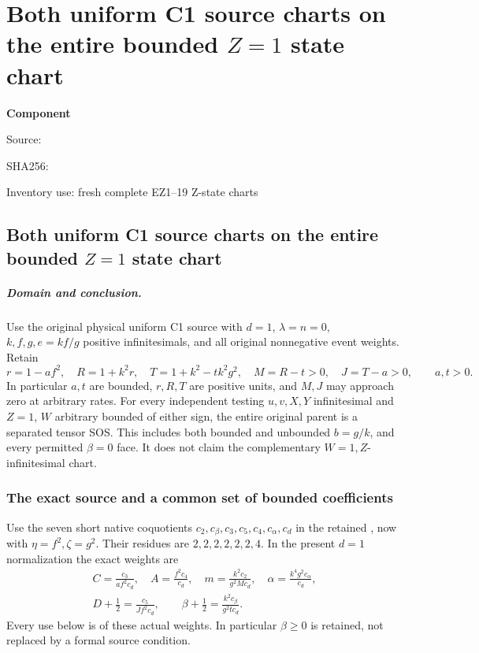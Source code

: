 \chapter{Both uniform C1 source charts on the entire bounded \(Z=1\) state chart}
\label{component:pa4f6d1e57f34}
\noindent\textbf{Component }\par
{\small\noindent Source: \par}
{\small\noindent SHA256: \par}
{\small\noindent Inventory use: fresh complete EZ1--19 Z-state charts\par}
\medskip
\section{Both uniform C1 source charts on the entire bounded \(Z=1\) state chart}
\label{pa4f6d1e57f34:sec:uniform-c1-z-new}

\paragraph{Domain and conclusion.}
Use the original physical uniform C1 source with $d=1$,
$\lambda=n=0$, $k,f,g,e=kf/g$ positive infinitesimals, and
all original nonnegative event weights. Retain
\[
 r=1-af^2,\quad R=1+k^2r,\quad
 T=1+k^2-tk^2g^2,\quad M=R-t>0,\quad J=T-a>0,
 \qquad a,t>0.                                                   \tag{EZ1}
\]
In particular $a,t$ are bounded, $r,R,T$ are positive units,
and $M,J$ may approach zero at arbitrary rates.
For every independent testing $u,v,X,Y$ infinitesimal and
$Z=1$, $W$ arbitrary bounded of either sign, the entire original
parent is a separated tensor SOS. This includes both bounded
and unbounded $b=g/k$, and every permitted $\beta=0$ face.
It does not claim the complementary $W=1,Z$-infinitesimal chart.

\subsection{The exact source and a common set of bounded coefficients}

Use the seven short native coquotients
$c_2,c_\beta,c_3,c_5,c_4,c_\alpha,c_d$ in the retained
, now with $\eta=f^2,\zeta=g^2$.
Their residues are $2,2,2,2,2,2,4$.
In the present $d=1$ normalization the exact weights are
\[
\begin{gathered}
 C=\frac{c_3}{af^2c_d},\quad A=\frac{f^2c_4}{c_d},\quad
 m=\frac{k^2c_2}{g^2Mc_d},\quad
 \alpha=\frac{k^4g^2c_\alpha}{c_d},\\
 D+\tfrac12=\frac{c_5}{Jf^2c_d},\qquad
 \beta+\tfrac12=\frac{k^2c_\beta}{g^2tc_d}.
\end{gathered}                                                   \tag{EZ2}
\]
Every use below is of these actual weights. In particular
$\beta\geq0$ is retained, not replaced by a formal source condition.

